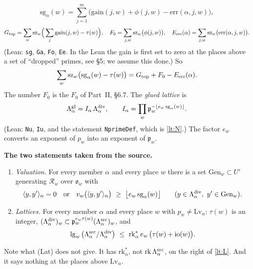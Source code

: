 \documentclass[11pt,letterpaper]{article}
\begin{document}
\begin{equation}\label{lt:sg}
 \mathrm{sg}_\alpha(w)=\sum_{j=1}^m\big(\mathrm{gain}(j,w)+\phi(j,w)-\mathrm{err}(\alpha,j,w)\big),
\end{equation}
\begin{equation}\label{lt:totals}
 G_{\rm top}=\sum_w\mathrm{sz}_w\Big(\sum_j\mathrm{gain}(j,w)-\tau(w)\Big),\quad
 F_0=\sum_{j,w}\mathrm{sz}_w\big(\phi(j,w)\big),\quad
 E_{\rm err}(\alpha)=\sum_{j,w}\mathrm{sz}_w\big(\mathrm{err}(\alpha,j,w)\big).
\end{equation}
(Lean: \texttt{sg}, \texttt{Ga}, \texttt{Fo}, \texttt{Ee}. In the Lean the gain is first set to zero at
the places above a set of ``dropped'' primes, see \S5; we assume this done.) So
\begin{equation}\label{lt:sgsum}
 \sum_w\mathrm{sz}_w\big(\mathrm{sg}_\alpha(w)-\tau(w)\big)=G_{\rm top}+F_0-E_{\rm err}(\alpha).
\end{equation}
The number $F_0$ is the $F_0$ of Part~II, \S6.7. The \emph{glued lattice} is
\begin{equation}\label{lt:N}
 \Lambda^{\rm gl}_\alpha=I_\alpha\,\Lambda^{\rm div}_\alpha,\qquad
 I_\alpha=\prod_w\mathfrak p_w^{-\lfloor e_w\,\mathrm{sg}_\alpha(w)\rfloor}.
\end{equation}
(Lean: \texttt{Nu}, \texttt{Iu}, and the statement \texttt{NprimeDef}, which is \eqref{lt:N}.) The factor
$e_w$ converts an exponent of $p_w$ into an exponent of $\mathfrak p_w$.

\textbf{The two statements taken from the source.}
\begin{enumerate}[leftmargin=3.4em,itemsep=2pt,topsep=2pt]
\item[\textup{(Val)}] \emph{Valuation.} For every member $\alpha$ and every place $w$ there is a set
$\mathrm{Gen}_w\subset U'$ generating $\mathcal R_w$ over $\mathfrak o_w$ with
\begin{equation}\label{lt:V}
 \langle y,y'\rangle_\alpha=0\quad\text{or}\quad
 v_w\big(\langle y,y'\rangle_\alpha\big)\ \ge\ \big\lfloor e_w\,\mathrm{sg}_\alpha(w)\big\rfloor
 \qquad(y\in\Lambda^{\rm div}_\alpha,\ y'\in\mathrm{Gen}_w).
\end{equation}
\item[\textup{(Lat)}] \emph{Lattices.} For every member $\alpha$ and every place $w$ with
$p_w\ne\mathrm{Lv}_\alpha$: $\tau(w)$ is an integer,
$(\Lambda^{\rm div}_\alpha)_w\subset\mathfrak p_w^{e_w\tau(w)}(\Lambda^{\rm src}_\alpha)_w$, and
\begin{equation}\label{lt:L}
 \lg_w\big(\Lambda^{\rm src}_\alpha/\Lambda^{\rm div}_\alpha\big)\ \le\
 \mathrm{rk}^*_\alpha\,e_w\,\big(\tau(w)+\mathrm{io}(w)\big).
\end{equation}
\end{enumerate}
Note what \textup{(Lat)} does not give. It has $\mathrm{rk}^*_\alpha$, not
$\mathrm{rk}\,\Lambda^{\rm src}_\alpha$, on the right of \eqref{lt:L}. And it says nothing at the places
above $\mathrm{Lv}_\alpha$.
\end{document}
